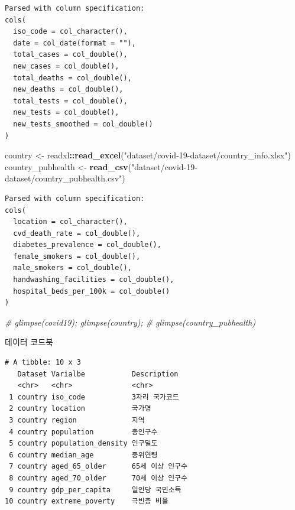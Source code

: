 \documentclass[
  11pt,
]{krantz}
\makeatletter
\newenvironment{Shaded}{\begin{snugshade}}{\end{snugshade}}
\newcommand{\CommentTok}[1]{\textcolor[rgb]{0.37,0.37,0.37}{\textit{#1}}}
\newcommand{\KeywordTok}[1]{\textcolor[rgb]{0.27,0.27,0.27}{\textbf{#1}}}
\newcommand{\NormalTok}[1]{#1}
\newcommand{\OperatorTok}[1]{\textcolor[rgb]{0.43,0.43,0.43}{\textbf{#1}}}
\newcommand{\StringTok}[1]{\textcolor[rgb]{0.5,0.5,0.5}{#1}}
\newenvironment{kframe}{%
\medskip{}
\setlength{\fboxsep}{.8em}
 \def\at@end@of@kframe{}%
 \ifinner\ifhmode%
  \def\at@end@of@kframe{\end{minipage}}%
  \begin{minipage}{\columnwidth}%
 \fi\fi%
 \def\FrameCommand##1{\hskip\@totalleftmargin \hskip-\fboxsep
 \colorbox{shadecolor}{##1}\hskip-\fboxsep
     \hskip-\linewidth \hskip-\@totalleftmargin \hskip\columnwidth}%
 \MakeFramed {\advance\hsize-\width
   \@totalleftmargin\z@ \linewidth\hsize
   \@setminipage}}%
 {\par\unskip\endMakeFramed%
 \at@end@of@kframe}
\renewenvironment{quote}{\begin{kframe}}{\end{kframe}}
\makeatother
\begin{document}
\begin{verbatim}
Parsed with column specification:
cols(
  iso_code = col_character(),
  date = col_date(format = ""),
  total_cases = col_double(),
  new_cases = col_double(),
  total_deaths = col_double(),
  new_deaths = col_double(),
  total_tests = col_double(),
  new_tests = col_double(),
  new_tests_smoothed = col_double()
)
\end{verbatim}

\begin{Shaded}
\begin{Highlighting}[]
\NormalTok{country <-}\StringTok{ }\NormalTok{readxl}\OperatorTok{::}\KeywordTok{read_excel}\NormalTok{(}\StringTok{"dataset/covid-19-dataset/country_info.xlsx"}\NormalTok{)}
\NormalTok{country_pubhealth <-}\StringTok{ }\KeywordTok{read_csv}\NormalTok{(}\StringTok{"dataset/covid-19-dataset/country_pubhealth.csv"}\NormalTok{)}
\end{Highlighting}
\end{Shaded}

\begin{verbatim}
Parsed with column specification:
cols(
  location = col_character(),
  cvd_death_rate = col_double(),
  diabetes_prevalence = col_double(),
  female_smokers = col_double(),
  male_smokers = col_double(),
  handwashing_facilities = col_double(),
  hospital_beds_per_100k = col_double()
)
\end{verbatim}

\begin{Shaded}
\begin{Highlighting}[]
\CommentTok{# glimpse(covid19); glimpse(country); }
\CommentTok{# glimpse(country_pubhealth)}
\end{Highlighting}
\end{Shaded}

\normalsize

\begin{quote}
데이터 코드북
\end{quote}

\footnotesize

\begin{verbatim}
# A tibble: 10 x 3
   Dataset Varialbe           Description     
   <chr>   <chr>              <chr>           
 1 country iso_code           3자리 국가코드  
 2 country location           국가명          
 3 country region             지역            
 4 country population         총인구수        
 5 country population_density 인구밀도        
 6 country median_age         중위연령        
 7 country aged_65_older      65세 이상 인구수
 8 country aged_70_older      70세 이상 인구수
 9 country gdp_per_capita     일인당 국민소득 
10 country extreme_poverty    극빈층 비율     
\end{verbatim}
\end{document}
